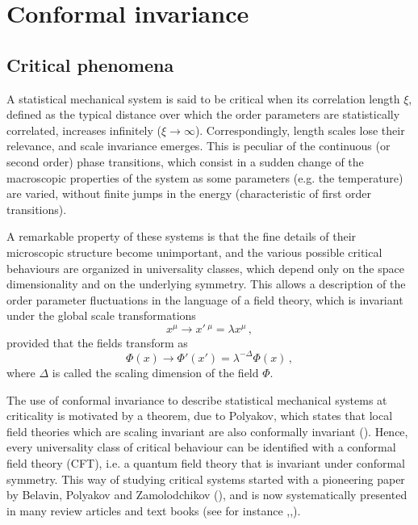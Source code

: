 \documentclass[a4paper,12pt]{report}
\begin{document}
\chapter{Conformal invariance}

\section{Critical phenomena}



A statistical mechanical system is said to be critical when its correlation length $\xi$, defined as the typical
distance over which the order parameters are statistically correlated, increases infinitely
($\xi\rightarrow\infty$). Correspondingly, length scales lose their relevance, and scale invariance emerges. This
is peculiar of the continuous (or second order) phase transitions, which consist in a sudden change of the
macroscopic properties of the system as some parameters (e.g. the temperature) are varied, without finite jumps
in the energy (characteristic of first order transitions).

A remarkable property of these systems is that the fine details of their microscopic structure become
unimportant, and the various possible critical behaviours are organized in universality classes, which depend
only on the space dimensionality and on the underlying symmetry. This allows a description of the order parameter
fluctuations in the language of a field theory, which is invariant under the global scale transformations
\begin{equation}\label{scaletr}
x^{\mu}\rightarrow x'\,^{\mu}=\lambda x^{\mu} \,,
\end{equation}
provided that the fields transform as
\begin{equation}\label{scalingdim}
\Phi(x)\rightarrow \Phi'(x')=\lambda^{-\Delta}\Phi(x) \,,
\end{equation}
where $\Delta$ is called the scaling dimension of the field $\Phi$.


The use of conformal invariance to describe statistical mechanical systems at criticality is motivated by a
theorem, due to Polyakov, which states that local field theories which are scaling invariant are also conformally
invariant (\cite{pol}). Hence, every universality class of critical behaviour can be identified with a conformal
field theory (CFT), i.e. a quantum field theory that is invariant under conformal symmetry. This way of studying
critical systems started with a pioneering paper by Belavin, Polyakov and Zamolodchikov (\cite{bpz}), and is now
systematically presented in many review articles and text books (see for instance
\cite{ginsp},\cite{zamrev},\cite{dif}).
\end{document}
